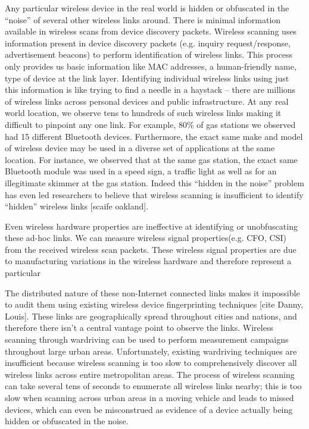 Any particular wireless device in the real world is hidden or obfuscated in the “noise” of several other wireless links around. There is minimal information available in wireless scans from device discovery packets. Wireless scanning uses information present in device discovery packets (e.g. inquiry request/response, advertisement beacons) to perform identification of wireless links. This process only provides us basic information like MAC addresses, a human-friendly name, type of device at the link layer. Identifying individual wireless links using just this information is like trying to find a needle in a haystack – there are millions of wireless links across personal devices and public infrastructure. At any real world location, we observe tens to hundreds of such wireless links making it difficult to pinpoint any one link. For example, 80\% of gas stations we observed had 15 different Bluetooth devices. Furthermore,  the exact same make and model of wireless device may be used in a diverse set of applications at the same location. For instance, we observed that at the same gas station, the exact same Bluetooth module was used in a speed sign, a traffic light as well as for an illegitimate skimmer at the gas station. Indeed this “hidden in the noise” problem has even led researchers to believe  that wireless scanning is insufficient to identify “hidden” wireless links [scaife oakland].

Even wireless hardware properties are ineffective at identifying or unobfuscating these ad-hoc links. We can measure wireless signal properties(e.g. CFO, CSI) from the received wireless scan packets. These wireless signal properties are due to manufacturing variations in the wireless hardware and therefore represent a particular

The distributed nature of these non-Internet connected links makes it impossible to audit them using existing wireless device fingerprinting techniques [cite Danny, Louis]. These links are geographically spread throughout cities and nations, and therefore there isn’t a central vantage point to observe the links. Wireless scanning through wardriving can be used to perform  measurement campaigns throughout large urban areas. Unfortunately, existing wardriving techniques are insufficient because wireless scanning is too slow to comprehensively discover all wireless links across entire metropolitan areas. The process of wireless scanning can take several tens of seconds to enumerate all wireless links nearby; this is too slow when scanning across urban areas in a moving vehicle and leads to missed devices, which can even be misconstrued as evidence of a device actually being hidden or obfuscated in the noise.





